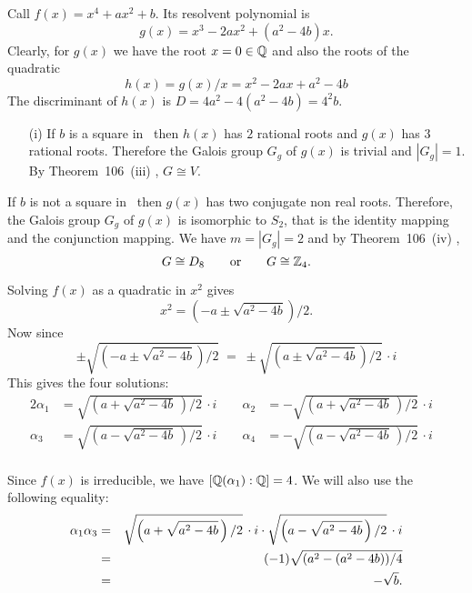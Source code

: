 \begin{myenumerate}
Call \(f(x) = x^4 + ax^2 + b\).
Its resolvent polynomial is
\begin{equation*}
g(x) = x^3 -2ax^2 + (a^2 -4b)x.
\end{equation*}
Clearly, for \(g(x)\) we have the root \(x=0\in \mathbb{Q}\)
and also the roots of the quadratic
\begin{equation*}
h(x) = g(x)/x = x^2 - 2ax + a^2 -4b
\end{equation*}
The discriminant of \(h(x)\) is \(D = 4a^2 - 4(a^2 -4b) = 4^2b\).

\begin{itemize}
 \item[(i)]
   If $b$ is a square in \Q\ then \(h(x)\) has $2$ rational roots
   and \(g(x)\) has $3$ rational roots. Therefore the Galois group
   \(G_g\) of \(g(x)\) is trivial and \(|G_g| = 1\).
   By Theorem~106~(iii) \cite{Rotman98}, \(G \cong V\).
\end{itemize}

If $b$ is not a square in \Q\ then \(g(x)\) has two conjugate non real
roots. Therefore, the Galois group \(G_g\) of \(g(x)\)
is isomorphic to \(S_2\), that is the identity mapping
and the conjunction mapping. We have \(m = |G_g| = 2\)
and by Theorem~106~(iv) \cite{Rotman98},
\begin{equation} \label{eq:D8Z4}
G \cong D_8 \qquad\textrm{or}\qquad G \cong \mathbb{Z}_4.
\end{equation}


Solving \(f(x)\) as a quadratic in \(x^2\) gives
\begin{equation*}
x^2 = \left(-a \pm \sqrt{a^2 - 4b}\right)/2.
\end{equation*}
Now since
\begin{equation*}
 \pm\sqrt{\left(-a \pm\sqrt{a^2-4b}\right)/2}
 \;=\; \pm\sqrt{\left(a \pm\sqrt{a^2-4b}\right)/2}\,\cdot i
\end{equation*}
This gives the four solutions:
\newcommand{\kapsol}[1]{\sqrt{\left(a #1\sqrt{a^2-4b}\,\right)/2}\,\cdot i}
\begin{alignat*}{2}
\alpha_1 &= \kapsol{+} \qquad  \alpha_2 &= -\kapsol{+} & \\
\alpha_3 &= \kapsol{-} \qquad  \alpha_4 &= -\kapsol{-} & \\
\end{alignat*}

Since \(f(x)\) is irreducible, we have \([\mathbb{Q}(\alpha_1):\mathbb{Q}] = 4\).
We will also use the following equality:
\begin{eqnarray}  \label{eq:kapsol13}
\alpha_1 \alpha_3
 & = & \kapsol{+} \cdot \kapsol{-} \\
 & = & (-1)\sqrt{(a^2 - (a^2 - 4b))/4} \notag \\
 & = & -\sqrt{b}. \notag
\end{eqnarray}


\end{myenumerate}
